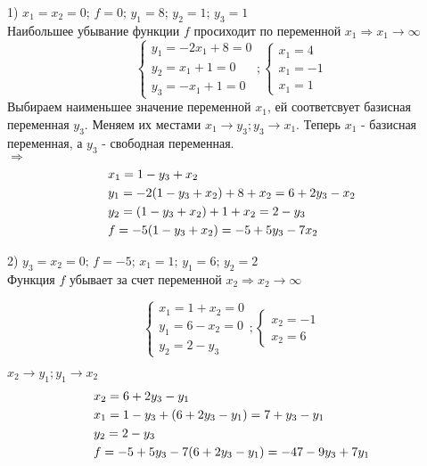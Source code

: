 \documentclass[12pt]{article}
\begin{document}
1) $x_1=x_2=0;\,f=0;\,y_1=8;\,y_2=1;\,y_3=1$\\
Наибольшее убывание функции $f$ просиходит по переменной $x_1\Rightarrow x_1 \to \infty$
\begin{equation}
  \begin{cases}
  y_1=-2x_1+8=0\\
  y_2=x_1+1=0\\
  y_3=-x_1+1=0
\end{cases};
\begin{cases}
  x_1=4 \\
  x_1=-1 \\
  x_1=1
\end{cases}
\end{equation}
Выбираем наименьшее значение переменной $x_1$, ей соответсвует базисная переменная $y_3$. Меняем их местами
$x_1 \to y_3;y_3\to x_1$. Теперь $x_1$ - базисная переменная, а $y_3$ - свободная переменная.\\
$\Rightarrow$
\begin{align}
    &x_1=1-y_3+x_2 \notag \\
    &y_1=-2(1-y_3+x_2)+8+x_2=6+2y_3-x_2 \\
    &y_2=(1-y_3+x_2)+1+x_2=2-y_3\notag\\
    &f = -5(1-y_3+x_2)=-5+5y_3-7x_2\notag
\end{align}

2) $y_3=x_2=0;\,f=-5;\,x_1=1;\,y_1=6;\,y_2=2$\\
Функция $f$ убывает за счет переменной $x_2 \Rightarrow x_2 \to \infty$

\begin{equation}
  \begin{cases}
  x_1=1+x_2=0\\
  y_1=6-x_2=0\\
  y_2=2-y_3
\end{cases};
\begin{cases}
  x_2=-1 \\
  x_2=6
\end{cases}
\end{equation}

$x_2\to y_1;y_1\to x_2$
\begin{align}
  &x_2=6+2y_3-y_1\notag\\
  &x_1=1-y_3+(6+2y_3-y_1)=7+y_3-y_1\\
  &y_2=2-y_3\notag\\
  &f=-5+5y_3-7(6+2y_3-y_1)=-47-9y_3+7y_1\notag
\end{align}
\end{document}
